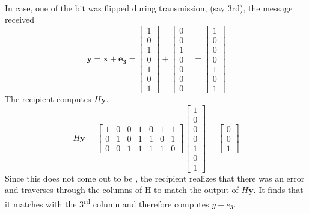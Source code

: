\documentclass[11pt,a4paper]{article}
\begin{document}
\paragraph{}
In case, one of the bit was flipped during transmission, (say 3rd), the message received 
$$
\mathbf{y} = \mathbf{x} + \mathbf{e_{3}} = 
\begin{bmatrix}
    1\\
    0\\
    1\\
    0\\
    1\\
    0\\
    1
\end{bmatrix}
+
\begin{bmatrix}
    0\\
    0\\
    1\\
    0\\
    0\\
    0\\
    0
\end{bmatrix}
=
\begin{bmatrix}
    1\\
    0\\
    0\\
    0\\
    1\\
    0\\
    1
\end{bmatrix}
$$
The recipient computes $H\mathbf{y}$.
$$
H\mathbf{y} = 
\begin{bmatrix}
    1 & 0 & 0 & 1 & 0 & 1 & 1\\
    0 & 1 & 0 & 1 & 1 & 0 & 1\\
    0 & 0 & 1 & 1 & 1 & 1 & 0
\end{bmatrix}
\begin{bmatrix}
    1\\
    0\\
    0\\
    0\\
    1\\
    0\\
    1
\end{bmatrix}
=
\begin{bmatrix}
    0\\
    0\\
    1
\end{bmatrix}
$$
Since this does not come out to be , the recipient realizes that there was an error and traverses through the columns of H to match the output of $H\mathbf{y}$. It finds that it matches with the 3\textsuperscript{rd} column and therefore computes $y + e_3$.
\end{document}
